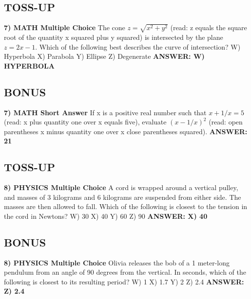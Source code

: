 \documentclass{article}
\begin{document}
\subsection*{TOSS-UP}
\textbf{7) MATH Multiple Choice} The cone $z=\sqrt{x^{2}+y^{2}}$ (read: z equals the square root of the quantity x squared plus y squared) is intersected by the plane $z=2x-1$. Which of the following best describes the curve of intersection?
\newline
W) Hyperbola
\newline
X) Parabola
\newline
Y) Ellipse
\newline
Z) Degenerate
\newline
\textbf{ANSWER: W) HYPERBOLA}

\subsection*{BONUS}
\textbf{7) MATH Short Answer} If x is a positive real number such that $x+1/x=5$ (read: x plus quantity one over x equals five), evaluate $(x-1/x)^{2}$ (read: open parentheses x minus quantity one over x close parentheses squared).
\newline
\textbf{ANSWER: 21}

\subsection*{TOSS-UP}
\textbf{8) PHYSICS Multiple Choice} A cord is wrapped around a vertical pulley, and masses of 3 kilograms and 6 kilograms are suspended from either side. The masses are then allowed to fall. Which of the following is closest to the tension in the cord in Newtons?
\newline
W) 30
\newline
X) 40
\newline
Y) 60
\newline
Z) 90
\newline
\textbf{ANSWER: X) 40}

\subsection*{BONUS}
\textbf{8) PHYSICS Multiple Choice} Olivia releases the bob of a 1 meter-long pendulum from an angle of 90 degrees from the vertical. In seconds, which of the following is closest to its resulting period?
\newline
W) 1
\newline
X) 1.7
\newline
Y) 2
\newline
Z) 2.4
\newline
\textbf{ANSWER: Z) 2.4}
\end{document}
